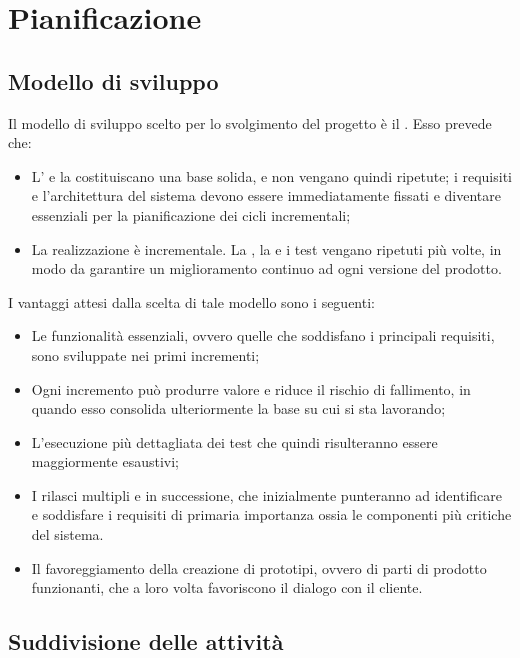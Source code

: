 \newpage
\section{Pianificazione}

\subsection{Modello di sviluppo}
Il modello di sviluppo scelto per lo svolgimento del progetto è il . Esso prevede che:
\begin{itemize}
	\item L' e la  costituiscano una base solida, e non vengano quindi ripetute; i requisiti e l'architettura del sistema devono essere immediatamente fissati e diventare essenziali per la pianificazione dei cicli incrementali;
	\item La realizzazione è incrementale. La , la  e i test vengano ripetuti più volte, in modo da garantire un miglioramento continuo ad ogni versione del prodotto.
\end{itemize}

I vantaggi attesi dalla scelta di tale modello sono i seguenti:
\begin{itemize}
	\item Le funzionalità essenziali, ovvero quelle che soddisfano i principali requisiti, sono sviluppate nei primi incrementi;
	\item Ogni incremento può produrre valore e riduce il rischio di fallimento, in quando esso consolida ulteriormente la base su cui si sta lavorando;
	\item L'esecuzione più dettagliata dei test che quindi risulteranno essere maggiormente esaustivi;
	\item I rilasci multipli e in successione, che inizialmente punteranno ad identificare e soddisfare i requisiti di primaria importanza ossia le componenti più critiche del sistema. 
	\item Il favoreggiamento della creazione di prototipi, ovvero di parti di prodotto funzionanti, che a loro volta favoriscono il dialogo con il cliente.
\end{itemize}

\subsection{Suddivisione delle attività}

